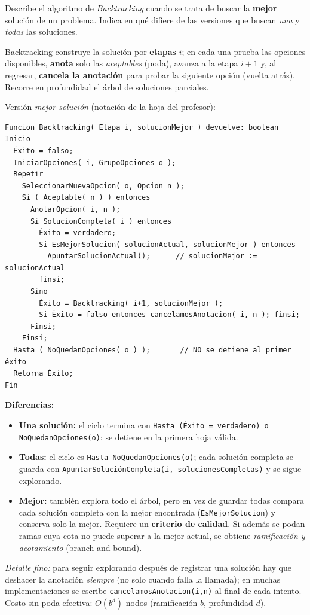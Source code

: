 \begin{prob}[\examen]
Describe el algoritmo de \emph{Backtracking} cuando se trata de buscar la \textbf{mejor} solución de un problema. Indica en qué difiere de las versiones que buscan \emph{una} y \emph{todas} las soluciones.
\end{prob}
\begin{sol}
Backtracking construye la solución por \textbf{etapas} $i$; en cada una prueba las opciones disponibles, \textbf{anota} solo las \emph{aceptables} (poda), avanza a la etapa $i+1$ y, al regresar, \textbf{cancela la anotación} para probar la siguiente opción (vuelta atrás). Recorre en profundidad el árbol de soluciones parciales.

Versión \emph{mejor solución} (notación de la hoja del profesor):
\begin{lstlisting}
Funcion Backtracking( Etapa i, solucionMejor ) devuelve: boolean
Inicio
  Éxito = falso;
  IniciarOpciones( i, GrupoOpciones o );
  Repetir
    SeleccionarNuevaOpcion( o, Opcion n );
    Si ( Aceptable( n ) ) entonces
      AnotarOpcion( i, n );
      Si SolucionCompleta( i ) entonces
        Éxito = verdadero;
        Si EsMejorSolucion( solucionActual, solucionMejor ) entonces
          ApuntarSolucionActual();      // solucionMejor := solucionActual
        finsi;
      Sino
        Éxito = Backtracking( i+1, solucionMejor );
        Si Éxito = falso entonces cancelamosAnotacion( i, n ); finsi;
      Finsi;
    Finsi;
  Hasta ( NoQuedanOpciones( o ) );       // NO se detiene al primer éxito
  Retorna Éxito;
Fin
\end{lstlisting}
\textbf{Diferencias:}
\begin{itemize}
\item \textbf{Una solución:} el ciclo termina con \texttt{Hasta (Éxito = verdadero) o NoQuedanOpciones(o)}: se detiene en la primera hoja válida.
\item \textbf{Todas:} el ciclo es \texttt{Hasta NoQuedanOpciones(o)}; cada solución completa se guarda con \texttt{ApuntarSoluciónCompleta(i, solucionesCompletas)} y se sigue explorando.
\item \textbf{Mejor:} también explora todo el árbol, pero en vez de guardar todas compara cada solución completa con la mejor encontrada (\texttt{EsMejorSolucion}) y conserva solo la mejor. Requiere un \textbf{criterio de calidad}. Si además se podan ramas cuya cota no puede superar a la mejor actual, se obtiene \emph{ramificación y acotamiento} (branch and bound).
\end{itemize}
\emph{Detalle fino:} para seguir explorando después de registrar una solución hay que deshacer la anotación \emph{siempre} (no solo cuando falla la llamada); en muchas implementaciones se escribe \texttt{cancelamosAnotacion(i,n)} al final de cada intento. Costo sin poda efectiva: $O(b^d)$ nodos (ramificación $b$, profundidad $d$).
\end{sol}

